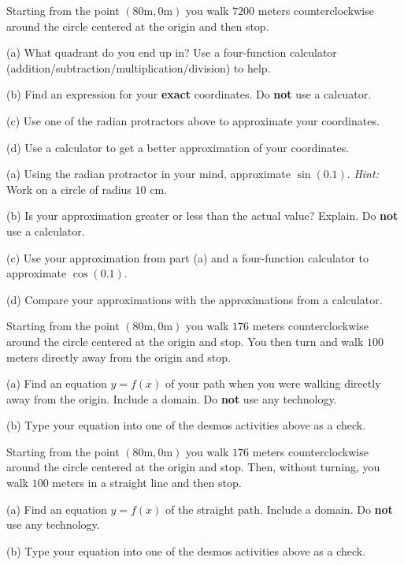 \documentclass{ximera}
\begin{document}
\begin{question}  \label{Qbast5r:Cosine}
Starting from the point $(80 \text{m},0 \text{m})$ you walk $7200$ meters counterclockwise around the circle centered at the origin and then stop.

(a) What quadrant do you end up in? Use a four-function calculator (addition/subtraction/multiplication/division) to help.

(b) Find an expression for your {\bf exact} coordinates. Do {\bf not} use a calcuator.

(c) Use one of the radian protractors above to approximate your coordinates.

(d) Use a calculator to get a better approximation of your coordinates.

\end{question}


\begin{question}  \label{Qfgarg:Cosine}
(a) Using the radian protractor in your mind, approximate $\sin (0.1)$. {\it Hint:} Work on a circle of radius $10$ cm.

(b) Is your approximation greater or less than the actual value? Explain. Do {\bf not} use a calculator.

(c) Use your approximation from part (a) and a four-function calculator to approximate $\cos(0.1)$. 

(d) Compare your approximations with the approximations from a calculator.

\end{question}



\begin{question}  \label{dsfb4t5r:Cosine}
Starting from the point $(80 \text{m},0 \text{m})$ you walk $176$ meters counterclockwise around the circle centered at the origin and stop. You then turn and walk $100$ meters directly away from the origin and stop.

(a) Find an equation $y=f(x)$ of your path when you were walking directly away from the origin. Include a domain. Do {\bf not} use any technology.

(b) Type your equation into one of the desmos activities above as a check.

\end{question}

\begin{question}  \label{sdfdsaf4t5r:Cosine}
Starting from the point $(80 \text{m},0 \text{m})$ you walk $176$ meters counterclockwise around the circle centered at the origin and stop. Then, without turning, you walk $100$ meters in a straight line and then stop.

(a) Find an equation $y=f(x)$ of the straight path. Include a domain. Do {\bf not} use any technology.

(b) Type your equation into one of the desmos activities above as a check.

\end{question}
\end{document}
